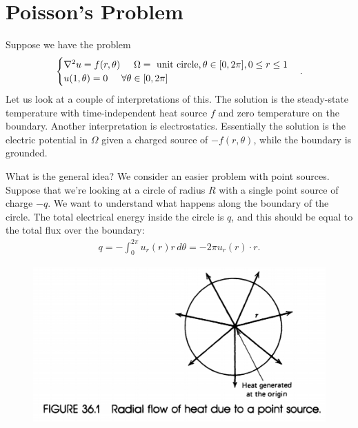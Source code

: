 \documentclass{article}
\theoremstyle{definition}
\begin{document}
\section{Poisson's Problem}
Suppose we have the problem
\begin{align*}
\begin{cases}
\laplacian u  = f(r,\theta) \hspace{0.5cm} \Omega = \text{ unit circle}, \theta\in [0,2\pi], 0\leq r \leq 1\\
u(1,\theta) = 0 \hspace{0.5cm}\forall \theta \in [0,2\pi]
\end{cases}.
\end{align*}
Let us look at a couple of interpretations of this. The solution is the steady-state temperature with time-independent heat source $f$ and zero temperature on the boundary. Another interpretation is electrostatics. Essentially the solution is the electric potential in $\Omega$ given a charged source of $-f(r,\theta)$, while the boundary is grounded. 

What is the general idea? We consider an easier problem with point sources. Suppose that we're looking at a circle of radius $R$ with a single point source of charge $-q$. We want to understand what happens along the boundary of the circle. The total electrical energy inside the circle is $q$, and this should be equal to the total flux over the boundary:
\begin{align*}
q = -\int^{2\pi}_0 u_r(r)r\,d\theta = -2\pi u_r(r)\cdot r.
\end{align*}

\begin{figure}[h!]
	\centering
	\includegraphics[scale=0.5]{charge3.png}
\end{figure}
\end{document}
